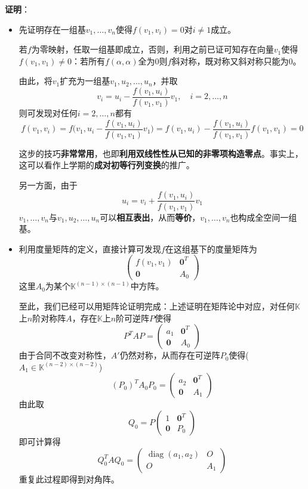 \documentclass[a4paper,UTF8,fontset=windows,AutoFakeBold]{ctexart}
\DeclareMathOperator{\diag}{diag}
\newcommand*{\note}{\noindent *}
\newcommand{\proo}[1]{{\vspace{5pt}\kaishu\noindent\textbf{证明}：\vspace{-3pt}
\begin{compactitem}
    \item[] #1
\end{compactitem}
}}
\begin{document}
\proo{
    \begin{itemize}
        \item 先证明存在一组基$v_1,\dots,v_n$使得$f(v_1,v_i)=0$对$i\ne1$成立。
        
        若$f$为零映射，任取一组基即成立，否则，利用之前已证可知存在向量$v_1$使得$f(v_1,v_1)\ne0$：若所有$f(\alpha,\alpha)$全为0则$f$斜对称，既对称又斜对称只能为0。

        由此，将$v_1$扩充为一组基$v_1,u_2,\dots,u_n$，并取
        $$v_i=u_i-\frac{f(v_1,u_i)}{f(v_1,v_1)}v_1,\quad i=2,\dots,n$$
        则可发现对任何$i=2,\dots,n$都有
        $$f(v_1,v_i)=f\bigg(v_1,u_i-\frac{f(v_1,u_i)}{f(v_1,v_1)}v_1\bigg)=f(v_1,u_i)-\frac{f(v_1,u_i)}{f(v_1,v_1)}f(v_1,v_1)=0$$
    
        \note 这步的技巧\textbf{非常常用}，也即\textbf{利用双线性性从已知的非零项构造零点}。事实上，这可以看作上学期的\textbf{成对初等行列变换}的推广。

        另一方面，由于
        $$u_i=v_i+\frac{f(v_1,u_i)}{f(v_1,v_1)}v_1$$
        $v_1,\dots,v_n$与$v_1,u_2,\dots,u_n$可以\textbf{相互表出}，从而\textbf{等价}，$v_1,\dots,v_n$也构成全空间一组基。

        \item 利用度量矩阵的定义，直接计算可发现$f$在这组基下的度量矩阵为
        $$\begin{pmatrix}f(v_1,v_1)&\mathbf{0}^T\\\mathbf{0}&A_0\end{pmatrix}$$
        这里$A_0$为某个$\mathbb{K}^{(n-1)\times(n-1)}$中方阵。

        至此，我们已经可以用矩阵论证明完成：上述证明在矩阵论中对应，对任何$\mathbb{K}$上$n$阶对称阵$A$，存在$\mathbb{K}$上$n$阶可逆阵$P$使得
        $$P^TAP=\begin{pmatrix}a_1&\mathbf{0}^T\\\mathbf{0}&A_0\end{pmatrix}$$
        由于合同不改变对称性，$A'$仍然对称，从而存在可逆阵$P_0$使得($A_1\in\mathbb{K}^{(n-2)\times(n-2)}$)
        $$(P_0)^TA_0P_0=\begin{pmatrix}a_2&\mathbf{0}^T\\\mathbf{0}&A_1\end{pmatrix}$$
        由此取
        $$Q_0=P\begin{pmatrix}1&\mathbf{0}^T\\\mathbf{0}&P_0\end{pmatrix}$$
        即可计算得
        $$Q_0^TAQ_0=\begin{pmatrix}\diag(a_1,a_2)&O\\O&A_1\end{pmatrix}$$
        重复此过程即得到对角阵。


\end{itemize}}
\end{document}
